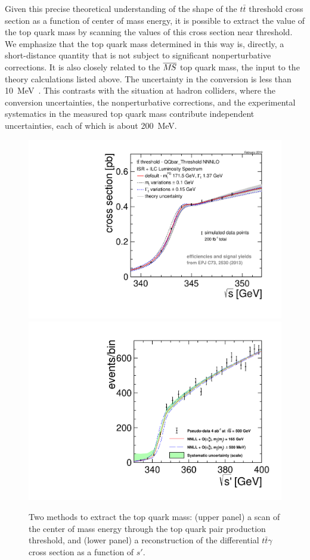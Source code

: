 Given this precise theoretical understanding of the shape of the
$t\bar t$ threshold cross section as a function of center of mass
energy, it is possible to extract the value of the top quark mass by
scanning the values of  this cross section near threshold.  We
emphasize that the top quark mass determined in this way is, directly,
a short-distance quantity that is not subject to significant
nonperturbative corrections.
It is also closely related to the $\msb$ top quark mass, the input to
the theory calculations listed above. The uncertainty in the
conversion is less than 10~MeV~\cite{Marquard:2015qpa}.  This
contrasts with the situation at hadron colliders, where the
conversion uncertainties, the nonperturbative corrections, and the
experimental systematics in the measured top quark mass
contribute  independent uncertainties, each of which is about
200~MeV. 


\begin{figure}[tb]
 \begin{center}
 \includegraphics[width=0.8\hsize]{chapters/figures/thresholdscan_top_mass.pdf}
 \includegraphics[width=0.8\hsize]{chapters/figures/alternative_top_mass.pdf}
\caption{Two methods to extract the top quark mass: (upper panel) a scan of the center of mass energy through the top quark pair production threshold, and (lower panel) a reconstruction of the differential $t\bar{t}\gamma$ cross section as a function of $s'$.
\label{fig:top_mass}}
 \end{center}
 \vspace{-0.7cm}
 \end{figure}
 


